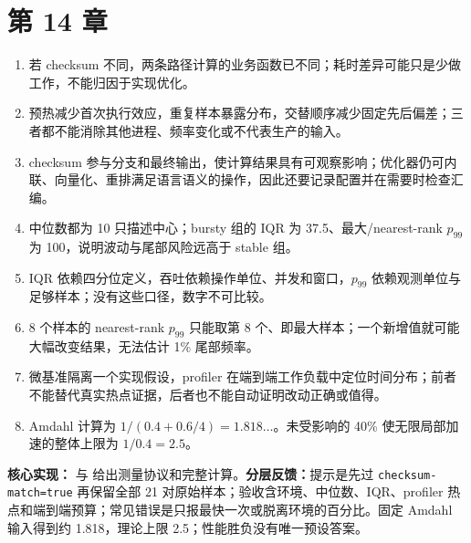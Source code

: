 \section{第 14 章}
\begin{enumerate}
  \item 若 checksum 不同，两条路径计算的业务函数已不同；耗时差异可能只是少做工作，不能归因于实现优化。
  \item 预热减少首次执行效应，重复样本暴露分布，交替顺序减少固定先后偏差；三者都不能消除其他进程、频率变化或不代表生产的输入。
  \item checksum 参与分支和最终输出，使计算结果具有可观察影响；优化器仍可内联、向量化、重排满足语言语义的操作，因此还要记录配置并在需要时检查汇编。
  \item 中位数都为 10 只描述中心；bursty 组的 IQR 为 37.5、最大/nearest-rank $p_{99}$ 为 100，说明波动与尾部风险远高于 stable 组。
  \item IQR 依赖四分位定义，吞吐依赖操作单位、并发和窗口，$p_{99}$ 依赖观测单位与足够样本；没有这些口径，数字不可比较。
  \item 8 个样本的 nearest-rank $p_{99}$ 只能取第 8 个、即最大样本；一个新增值就可能大幅改变结果，无法估计 1\% 尾部频率。
  \item 微基准隔离一个实现假设，profiler 在端到端工作负载中定位时间分布；前者不能替代真实热点证据，后者也不能自动证明改动正确或值得。
  \item Amdahl 计算为 $1/(0.4+0.6/4)=1.818\ldots$。未受影响的 40\% 使无限局部加速的整体上限为 $1/0.4=2.5$。
\end{enumerate}

\noindent\textbf{核心实现：} 与  给出测量协议和完整计算。\textbf{分层反馈：}提示是先过 \texttt{checksum-match=true} 再保留全部 21 对原始样本；验收含环境、中位数、IQR、profiler 热点和端到端预算；常见错误是只报最快一次或脱离环境的百分比。固定 Amdahl 输入得到约 1.818，理论上限 2.5；性能胜负没有唯一预设答案。

